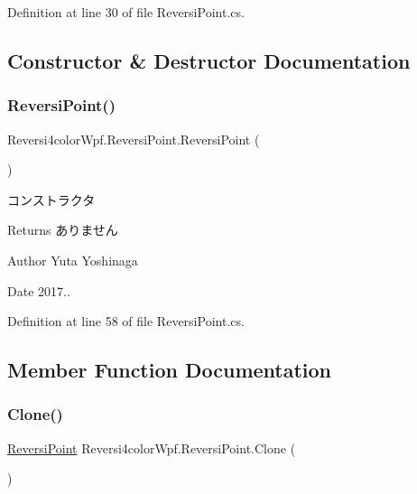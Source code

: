 Definition at line 30 of file Reversi\+Point.\+cs.



\subsection{Constructor \& Destructor Documentation}
\mbox{\label{class_reversi4color_wpf_1_1_reversi_point_a822291b557aaa185521717e47621bcdd}} 
\subsubsection{\texorpdfstring{Reversi\+Point()}{ReversiPoint()}}
{\footnotesize\ttfamily Reversi4color\+Wpf.\+Reversi\+Point.\+Reversi\+Point (\begin{DoxyParamCaption}{ }\end{DoxyParamCaption})}



コンストラクタ 

\begin{DoxyReturn}{Returns}
ありません 
\end{DoxyReturn}
\begin{DoxyAuthor}{Author}
Yuta Yoshinaga 
\end{DoxyAuthor}
\begin{DoxyDate}{Date}
2017.. 
\end{DoxyDate}


Definition at line 58 of file Reversi\+Point.\+cs.



\subsection{Member Function Documentation}
\mbox{\label{class_reversi4color_wpf_1_1_reversi_point_a2c8e58a48a5199c8ccf3ca72e5517de9}} 
\subsubsection{\texorpdfstring{Clone()}{Clone()}}
{\footnotesize\ttfamily \hyperlink{class_reversi4color_wpf_1_1_reversi_point}{Reversi\+Point} Reversi4color\+Wpf.\+Reversi\+Point.\+Clone (\begin{DoxyParamCaption}{ }\end{DoxyParamCaption})}




